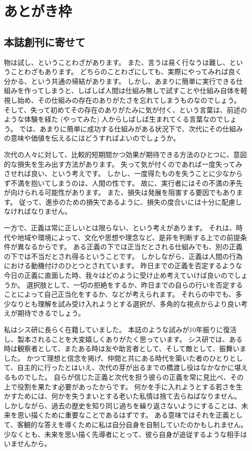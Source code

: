 \chapter{あとがき枠}

\section{本誌創刊に寄せて}

物は試し、ということわざがあります。
また、言うは易く行なうは難し、ということわざもあります。
どちらのことわざにしても、実際にやってみれば良く分かる、という共通の帰結があります。
しかし、あまりに簡単に実行できる仕組みを作ってしまうと、しばしば人間は仕組み無しで試すことや仕組み自体を軽視し始め、その仕組みの存在のありがたさを忘れてしまうものなのでしょう。
そして、失って初めてその存在のありがたみに気が付く、という言葉は、前述のような体験を経た (やってみた) 人からしばしば生まれてくる言葉なのでしょう。
では、あまりに簡単に成功する仕組みがある状況下で、次代にその仕組みの意味や価値を伝えるにはどうすればよいのでしょうか。

次代の人々に対して、比較的短期間かつ効果が期待できる方法のひとつに、意図的な損失を生み出す方法があります。
失って気が付くのであれば一度失ってみさせれば良い、という考えです。
しかし、一度得たものを失うことに少なからず不満を抱いてしまうのは、人間の性です。
故に、実行者にはその不満の矛先が向けられる可能性があります。
また、損失は発展を阻害する要因でもあります。
従って、進歩のための損失であるように、損失の度合いには十分に配慮しなければなりません。

一方で、正義は常に正しいとは限らない、という考えがあります。
それは、時代や地域や環境によって、文化や思想や理念など、是非を判断する上での前提条件が異なるからです。
ある正義の下では正当だとされる仕組みでも、別の正義の下では不当だとされ得るということです。
しかしながら、正義は人間の行為における動機付けのひとつとされています。
昨日までの正義を否定するような今日の正義に直面した時、我々はどのように受け止め考えていけば良いのでしょうか。
選択肢として、一切の拒絶をするか、昨日までの自らの行いを否定することによって自己正当化をするか、などが考えられます。
それらの中でも、多少なりとも理解を試み受け入れようとする選択が、多角的な視点からより良い考えが期待できるでしょう。

私はシス研に長らく在籍していました。
本誌のような試みが10年振りに復活し、製本されることを大変嬉しくありがたく思っています。
シス研では、ある時は観察者として、またある時は友や助言者として、そして敵として、振舞いました。
かつて理想と信念を掲げ、仲間と共にある時代を築いた者のひとりとして、自主的に行ったとはいえ、次代の芽が出るまでの橋渡し役はなかなかに堪えるものでした。
自らが信じた正義と次代を担う彼らの正義を常に見比べ、その上で役割を果たす必要があったからです。
何かを手に入れようとする若さを生かすためには、何かを失うまいとする老いた私情は捨て去らねばなりません。
しかしながら、過去の歴史を知り同じ過ちを繰り返さないようにすることは、未来を思い描くために重要なことであるはずです。
ある意味ではそれを正義として、客観的な答えを導くために私は自分自身を自制していたのかもしれません。
少なくとも、未来を思い描く先導者にとって、彼ら自身が追従するような相手はいませんから。

